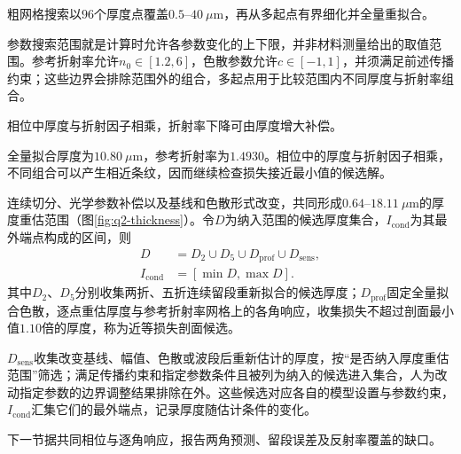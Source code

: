 粗网格搜索以$96$个厚度点覆盖$0.5$--$40\ \mu\mathrm{m}$，再从多起点有界细化并全量重拟合。

参数搜索范围就是计算时允许各参数变化的上下限，并非材料测量给出的取值范围。参考折射率允许$n_0\in[1.2,6]$，色散参数允许$c\in[-1,1]$，并须满足前述传播约束；这些边界会排除范围外的组合，多起点用于比较范围内不同厚度与折射率组合。

相位中厚度与折射因子相乘，折射率下降可由厚度增大补偿。

全量拟合厚度为$10.80\ \mu\mathrm{m}$，参考折射率为$1.4930$。相位中的厚度与折射因子相乘，不同组合可以产生相近条纹，因而继续检查损失接近最小值的候选解。

连续切分、光学参数补偿以及基线和色散形式改变，共同形成$0.64$--$18.11\ \mu\mathrm{m}$的厚度重估范围（图\ref{fig:q2-thickness}）。令$D$为纳入范围的候选厚度集合，$I_{\mathrm{cond}}$为其最外端点构成的区间，则
\begin{equation}
\begin{aligned}
D&=D_2\cup D_5\cup D_{\mathrm{prof}}\cup D_{\mathrm{sens}},\\
I_{\mathrm{cond}}&=[\min D,\max D].
\end{aligned}
\label{eq:q2-range}
\end{equation}
其中$D_2$、$D_5$分别收集两折、五折连续留段重新拟合的候选厚度；$D_{\mathrm{prof}}$固定全量拟合色散，逐点重估厚度与参考折射率网格上的各角响应，收集损失不超过剖面最小值$1.10$倍的厚度，称为近等损失剖面候选。

$D_{\mathrm{sens}}$收集改变基线、幅值、色散或波段后重新估计的厚度，按“是否纳入厚度重估范围”筛选；满足传播约束和指定参数条件且被列为纳入的候选进入集合，人为改动指定参数的边界调整结果排除在外。这些候选对应各自的模型设置与参数约束，$I_{\mathrm{cond}}$汇集它们的最外端点，记录厚度随估计条件的变化。

下一节据共同相位与逐角响应，报告两角预测、留段误差及反射率覆盖的缺口。
